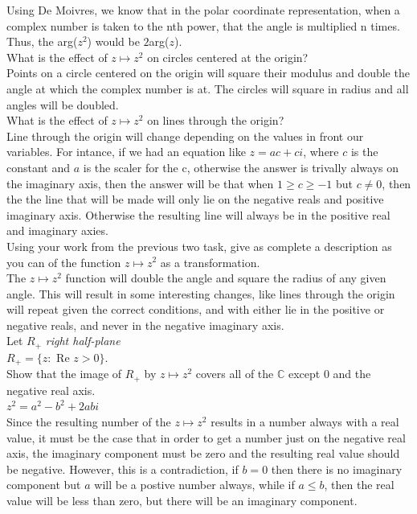 \documentclass[12pt]{article}
\begin{document}
Using De Moivres, we know that in the polar coordinate representation, when a complex number is taken to the nth power, that the angle is multiplied n times.
Thus, the arg($z^2$) would be $2$arg($z$).\\


 What is the effect of $z \mapsto z^2$ on circles centered at the origin?\\
Points on a circle centered on the origin will square their modulus and double the angle at which the complex number is at.
The circles will square in radius and all angles will be doubled.\\ 

 What is the effect of $z \mapsto z^2$ on lines through the origin?\\
Line through the origin will change depending on the values in front our variables.
For intance, if we had an equation like $z = ac + ci$, where $c$ is the constant and $a$ is the scaler for the c, otherwise the answer is trivally always on the imaginary axis, then the answer will be that when $1 \geq c \geq -1$
but $c \neq 0$, then the the line that will be made will only lie on the negative reals and positive imaginary axis. 
Otherwise the resulting line will always be in the positive real and imaginary axies.\\



 Using your work from the previous two task, give as complete a description as you can of the function $z \mapsto z^2$ as a transformation.\\
The $z \mapsto z^2$ function will double the angle and square the radius of any given angle. 
This will result in some interesting changes, like lines through the origin will repeat given the correct conditions, and with either lie in the positive or negative reals, and never in the negative imaginary axis.\\


Let $R_+$ \textit{right half-plane}\\
$R_+ = \{z: $ Re $z > 0\}.$\\


 Show that the image of $R_+$ by $z \mapsto z^2$ covers all of the $\mathbb{C}$ except 0 and the negative real axis.\\

$z^2 = a^2 - b^2 + 2abi$\\

Since the resulting number of the $z \mapsto z^2$ results in a number always with a real value, it must be the case that in order to get a number just on the negative real axis, the imaginary component must be zero and the resulting real value should be negative.
However, this is a contradiction, if $b = 0$ then there is no imaginary component but $a$ will be a postive number always, while if $a \leq b$, then the real value will be less than zero, but there will be an imaginary component.\\
\end{document}
